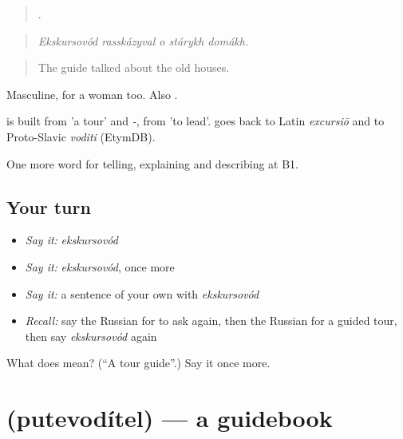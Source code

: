 \begin{quote}
    .
\end{quote}

\begin{quote}
\emph{Ekskursovód rasskázyval o stárykh domákh.}
\end{quote}

\begin{quote}
The guide talked about the old houses.
\end{quote}

Masculine, for a woman too. Also \emph{}.

\begin{cousinweb}
\emph{} is built from \emph{} 'a tour' and \emph{-}, from \emph{} 'to lead'. \emph{} goes back to Latin \emph{excursiō} and \emph{} to Proto-Slavic \emph{voditi} (EtymDB).
\end{cousinweb}

\begin{grammarlens}[title={What you've built}]
One more word for telling, explaining and describing at B1.
\end{grammarlens}

\subsection*{Your turn}
\begin{itemize}
\raggedright
  \item \emph{Say it:} \emph{ekskursovód}
  \item \emph{Say it:} \emph{ekskursovód}, once more
  \item \emph{Say it:} a sentence of your own with \emph{ekskursovód}
  \item \emph{Recall:} say the Russian for to ask again, then the Russian for a guided tour, then say \emph{ekskursovód} again
\end{itemize}

\begin{tcolorbox}[breakable,colback=teal!4,colframe=teal!35!black,title={Before you move on}]
What does  mean? (\textquotedblleft{}A tour guide\textquotedblright{}.) Say it once more.
\end{tcolorbox}
\section[\texorpdfstring{\ru{путеводитель} (putevodítel)}{путеводитель (putevodítel)}]{ (putevodítel) — a guidebook}

